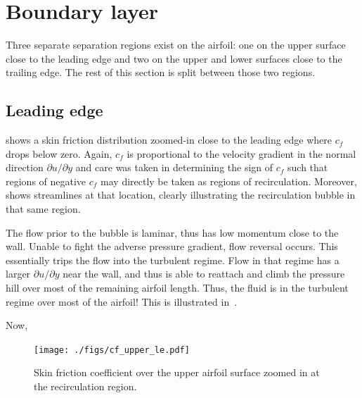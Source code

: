 \section{Boundary layer}
\label{sec:bl}
Three separate separation regions exist on the airfoil: one on the upper surface
close to the leading edge and two on the upper and lower surfaces close to the
trailing edge. The rest of this section is split between those two regions.

\subsection{Leading edge}
 shows a skin friction distribution zoomed-in close to the leading
edge where $c_f$ drops below zero. Again, $c_f$ is proportional to the velocity gradient
in the normal direction $\partial u/\partial y$ and care was taken in determining the sign
of $c_f$ such that regions of negative $c_f$ may directly be taken as regions of
recirculation. Moreover,  shows
streamlines at that location, clearly illustrating the recirculation bubble in that
same region.

The flow prior to the bubble is laminar, thus has low momentum close to the wall. Unable
to fight the adverse pressure gradient, flow reversal occurs. This essentially trips
the flow into the turbulent regime. Flow in that regime has a larger $\partial u/\partial y$
near the wall, and thus is able to reattach and climb the pressure hill over most of the
remaining airfoil length.  Thus, the fluid is in the turbulent regime
over most of the airfoil! This is illustrated in~.

Now,

\begin{figure}
    \centering
    \texttt{[image: ./figs/cf\_upper\_le.pdf]}
    \caption{Skin friction coefficient over the upper airfoil surface zoomed in
        at the recirculation region.}\label{fig:cf_upper_le}
\end{figure}

